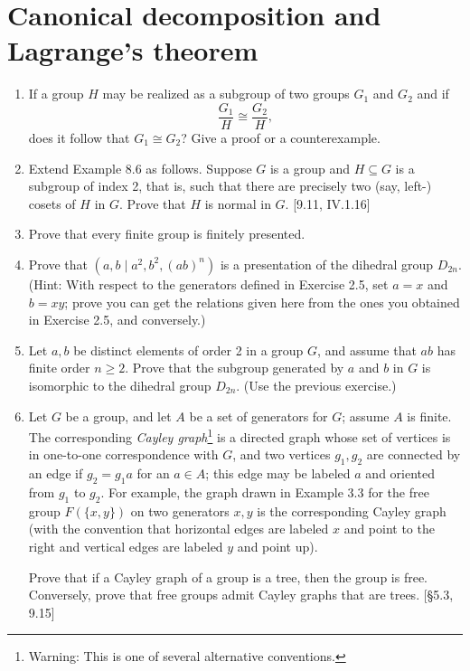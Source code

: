 \section{Canonical decomposition and Lagrange's theorem}
\begin{enumerate}
      \item If a group $H$ may be realized as a subgroup of two groups $G_1$ and $G_2$ and if
            \[ \frac{G_1}{H} \cong \frac{G_2}{H}, \]
            does it follow that $G_1 \cong G_2$? Give a proof or a counterexample.

      \item Extend Example 8.6 as follows. Suppose $G$ is a group and $H \subseteq G$ is a subgroup of index 2, that is, such that there are precisely two (say, left-) cosets of $H$ in $G$. Prove that $H$ is normal in $G$. [9.11, IV.1.16]

      \item Prove that every finite group is finitely presented.

      \item Prove that $(a,b \mid a^2, b^2, (ab)^n)$ is a presentation of the dihedral group $D_{2n}$. (Hint: With respect to the generators defined in Exercise 2.5, set $a=x$ and $b=xy$; prove you can get the relations given here from the ones you obtained in Exercise 2.5, and conversely.)

      \item Let $a, b$ be distinct elements of order 2 in a group $G$, and assume that $ab$ has finite order $n \ge 2$. Prove that the subgroup generated by $a$ and $b$ in $G$ is isomorphic to the dihedral group $D_{2n}$. (Use the previous exercise.)

      \item Let $G$ be a group, and let $A$ be a set of generators for $G$; assume $A$ is finite. The corresponding \emph{Cayley graph}\footnote{Warning: This is one of several alternative conventions.} is a directed graph whose set of vertices is in one-to-one correspondence with $G$, and two vertices $g_1, g_2$ are connected by an edge if $g_2 = g_1 a$ for an $a \in A$; this edge may be labeled $a$ and oriented from $g_1$ to $g_2$. For example, the graph drawn in Example 3.3 for the free group $F(\{x,y\})$ on two generators $x, y$ is the corresponding Cayley graph (with the convention that horizontal edges are labeled $x$ and point to the right and vertical edges are labeled $y$ and point up).

            Prove that if a Cayley graph of a group is a tree, then the group is free. Conversely, prove that free groups admit Cayley graphs that are trees. [\S5.3, 9.15]


\end{enumerate}
